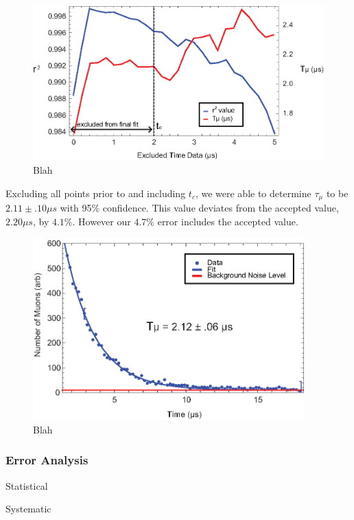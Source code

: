 \begin{figure}[htbp]
\begin{center}
\includegraphics[height=60mm]{./figures/lifetime_fit_param.eps}
\caption{Blah}
\label{figure:logic}
\end{center}
\end{figure}

Excluding all points prior to and including $t_{c}$, we were able to determine $\tau_{\mu}$ to be $2.11 \pm .10 \mu s$ with 95\% confidence.  This value deviates from the accepted value, $2.20\mu s$, by $4.1\%$.  However our $4.7\%$ error includes the accepted value.

\begin{figure}[htbp]
\begin{center}
\includegraphics[height=70mm]{./figures/muon_decay.eps}
\caption{Blah}
\label{figure:logic}
\end{center}
\end{figure}


\subsubsection{Error Analysis}

Statistical

Systematic

